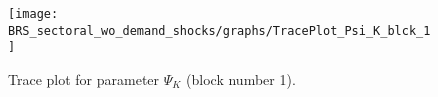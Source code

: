 \begin{figure}[H]
\centering
  \texttt{[image: BRS\_sectoral\_wo\_demand\_shocks/graphs/TracePlot\_Psi\_K\_blck\_1]}\\
    \caption{Trace plot for parameter ${\Psi_{K}}$ (block number 1).}
\end{figure}
